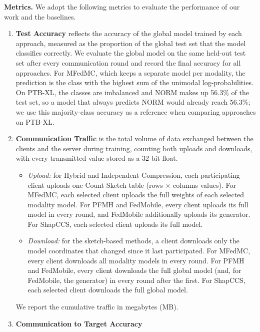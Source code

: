 \documentclass[sigconf]{acmart}
\newcommand{\method}{Hybrid}   %
\begin{document}
\textbf{Metrics.}
We adopt the following metrics to evaluate the performance of our work and the baselines.
\begin{enumerate}
  \item \textbf{Test Accuracy}
  reflects the accuracy of the global model trained by each approach, measured as the proportion of the global test set that the model classifies correctly. We evaluate the global model on the same held-out test set after every communication round and record the final accuracy for all approaches. For MFedMC, which keeps a separate model per modality, the prediction is the class with the highest sum of the unimodal log-probabilities. On PTB-XL, the classes are imbalanced and NORM makes up 56.3\% of the test set, so a model that always predicts NORM would already reach 56.3\%; we use this majority-class accuracy as a reference when comparing approaches on PTB-XL.

  \item \textbf{Communication Traffic}
  is the total volume of data exchanged between the clients and the server during training, counting both uploads and downloads, with every transmitted value stored as a 32-bit float.
  \begin{itemize}
    \item \textit{Upload:} for \method{} and Independent Compression, each participating client uploads one Count Sketch table (rows $\times$ columns values). For MFedMC, each selected client uploads the full weights of each selected modality model. For PFMH and FedMobile, every client uploads its full model in every round, and FedMobile additionally uploads its generator. For ShapCCS, each selected client uploads its full model.
    \item \textit{Download:} for the sketch-based methods, a client downloads only the model coordinates that changed since it last participated. For MFedMC, every client downloads all modality models in every round. For PFMH and FedMobile, every client downloads the full global model (and, for FedMobile, the generator) in every round after the first. For ShapCCS, each selected client downloads the full global model.
  \end{itemize}
  We report the cumulative traffic in megabytes (MB).

  \item \textbf{Communication to Target Accuracy}
  
\end{enumerate}
\end{document}
